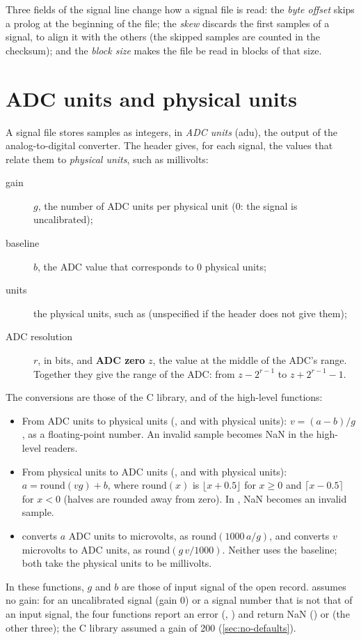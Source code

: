 Three fields of the signal line change how a signal file is read: the
\emph{byte offset} skips a prolog at the beginning of the file; the
\emph{skew} discards the first samples of a signal, to align it with the
others (the skipped samples are counted in the checksum); and the
\emph{block size} makes the file be read in blocks of that size.

\section{ADC units and physical units}
\label{sec:units}

A signal file stores samples as integers, in \emph{ADC units} (adu), the
output of the analog-to-digital converter. The header gives, for each
signal, the values that relate them to \emph{physical units}, such as
millivolts:
\begin{description}
\item[gain] $g$, the number of ADC units per physical unit (0: the signal
  is uncalibrated);
\item[baseline] $b$, the ADC value that corresponds to 0 physical units;
\item[units] the physical units, such as  (unspecified if the
  header does not give them);
\item[ADC resolution] $r$, in bits, and \textbf{ADC zero} $z$, the value at
  the middle of the ADC's range. Together they give the range of the ADC:
  from $z - 2^{r-1}$ to $z + 2^{r-1} - 1$.
\end{description}

The conversions are those of the C library, and of the high-level
functions:
\begin{itemize}
\item From ADC units to physical units (, and
   with physical units): $v = (a - b)/g$, as a
  floating-point number. An invalid sample becomes NaN in the high-level
  readers.
\item From physical units to ADC units (, and
   with physical units): $a = \mathrm{round}(v g) + b$,
  where $\mathrm{round}(x)$ is $\lfloor x + 0.5\rfloor$ for $x \ge 0$ and
  $\lceil x - 0.5\rceil$ for $x < 0$ (halves are rounded away from zero).
  In , NaN becomes an invalid sample.
\item {} converts $a$ ADC units to microvolts, as
  $\mathrm{round}(1000\,a/g)$, and  converts $v$
  microvolts to ADC units, as $\mathrm{round}(g\,v/1000)$. Neither uses the
  baseline; both take the physical units to be millivolts.
\end{itemize}
In these functions, $g$ and $b$ are those of input signal  of the
open record. \wfdbx{} assumes no gain: for an uncalibrated signal (gain 0)
or a signal number that is not that of an input signal, the four functions
report an error (,
) and return NaN () or
 (the other three); the C library assumed a gain
of 200 (\cref{sec:no-defaults}).

